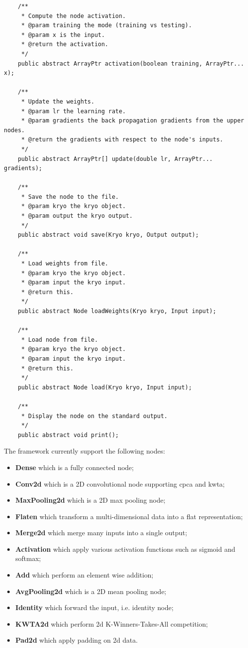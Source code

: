 \documentclass[11pt]{report}
\begin{document}
\begin{verbatim}
    /**
     * Compute the node activation.
     * @param training the mode (training vs testing).
     * @param x is the input.
     * @return the activation.
     */
    public abstract ArrayPtr activation(boolean training, ArrayPtr... x);

    /**
     * Update the weights.
     * @param lr the learning rate.
     * @param gradients the back propagation gradients from the upper nodes.
     * @return the gradients with respect to the node's inputs.
     */
    public abstract ArrayPtr[] update(double lr, ArrayPtr... gradients);

    /**
     * Save the node to the file.
     * @param kryo the kryo object.
     * @param output the kryo output.
     */
    public abstract void save(Kryo kryo, Output output);

    /**
     * Load weights from file.
     * @param kryo the kryo object.
     * @param input the kryo input.
     * @return this.
     */
    public abstract Node loadWeights(Kryo kryo, Input input);

    /**
     * Load node from file.
     * @param kryo the kryo object.
     * @param input the kryo input.
     * @return this.
     */
    public abstract Node load(Kryo kryo, Input input);

    /**
     * Display the node on the standard output.
     */
    public abstract void print();
\end{verbatim}

\noindent The framework currently support the following nodes:
\begin{itemize}
	\item \textbf{Dense} which is a fully connected node;
	\item \textbf{Conv2d} which is a 2D convolutional node supporting \acrshort{cpca} and  \acrshort{kwta};
	\item \textbf{MaxPooling2d} which is a 2D max pooling node;
	\item \textbf{Flaten} which transform a multi-dimensional data into a flat representation;
	\item \textbf{Merge2d} which merge many inputs into a single output;
	\item \textbf{Activation} which apply various activation functions such as sigmoid and softmax;
	\item \textbf{Add} which perform an element wise addition;
	\item \textbf{AvgPooling2d} which is a 2D mean pooling node;
	\item \textbf{Identity} which forward the input, i.e. identity node;
	\item \textbf{KWTA2d} which perform 2d K-Winners-Takes-All competition;
	\item \textbf{Pad2d} which apply padding on 2d data.
\end{itemize}
\end{document}
